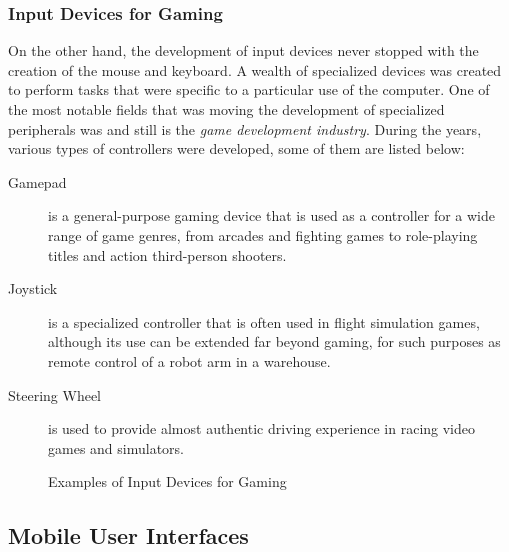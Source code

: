 \subsubsection{Input Devices for Gaming}

On the other hand, the development of input devices never stopped with the
creation of the mouse and keyboard. A wealth of specialized devices was
created to perform tasks that were specific to a particular use of the
computer. One of the most notable fields that was moving the development of
specialized peripherals was and still is the \emph{game development industry}.
During the years, various types of controllers were developed, some of them
are listed below:

\begin{description}

    \item [Gamepad] is a general-purpose gaming device that is used as a
        controller for a wide range of game genres, from arcades and fighting
        games to role-playing titles and action third-person shooters.

    \item [Joystick] is a specialized controller that is often used in flight
        simulation games, although its use can be extended far beyond gaming, for such
        purposes as remote control of a robot arm in a warehouse.

    \item [Steering Wheel] is used to provide almost authentic driving
        experience in racing video games and simulators.

\end{description}


\begin{figure}[!ht]
    \centering
    \caption{Examples of Input Devices for Gaming}
\end{figure}


\subsection{Mobile User Interfaces}

